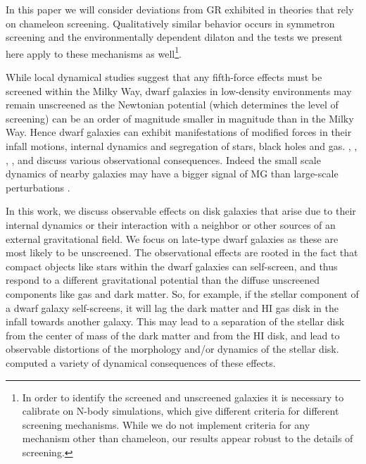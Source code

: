 \documentclass[useAMS,usenatbib,twocolumn]{mn2e}
\begin{document}
In this paper we will consider deviations from GR exhibited in
theories that rely on chameleon screening.
Qualitatively similar behavior occurs in symmetron screening
\citep{hinterbichler10} and the environmentally dependent
dilaton \citep{brax10} and the tests we  present here apply
to these mechanisms as well\footnote{In order to identify the screened and
  unscreened galaxies it is necessary to calibrate on N-body simulations,
  which give different criteria for different screening mechanisms. While
  we do not implement criteria for any mechanism other than chameleon,  
  our results appear robust to the details of screening.}. 

While local dynamical studies suggest that any fifth-force effects must be
screened within the Milky Way, 
dwarf galaxies in low-density environments may remain unscreened as the 
Newtonian potential (which determines the level of screening) can be an order of
magnitude 
smaller in magnitude than in the Milky Way. Hence dwarf galaxies can
exhibit manifestations of modified forces in  their infall motions, 
internal dynamics and segregation of stars, black holes and gas. \citet{hui09}, \citet{hui10}, \citet{bhuvjake2011},
\citet{changhui}, and \citet{jainvinu2012}
discuss various observational consequences. Indeed the small scale dynamics of 
nearby galaxies may have a bigger signal of MG than large-scale perturbations 
\citep[see][for a discussion of observational approaches]{jain11}.
 
In this work, we discuss observable effects on disk galaxies that  arise due to 
their internal dynamics or their interaction with a neighbor or other sources of
an external gravitational field. We focus on late-type dwarf galaxies as these
are most likely to be unscreened. The observational effects are rooted in the
fact that compact objects like stars within
the dwarf galaxies can self-screen, and thus respond to a different
gravitational potential than the diffuse unscreened components like gas and dark matter.
So, for example, if the stellar component of a dwarf galaxy self-screens,
it will lag the dark matter and HI gas disk in the infall towards
another galaxy. This may lead to a separation of the stellar disk from the
center of mass of the dark matter and from the HI disk, and lead to
observable distortions of the morphology and/or dynamics of the stellar disk.
\citet{bhuvjake2011} computed a variety of dynamical consequences of these
effects. 
 
\end{document}
